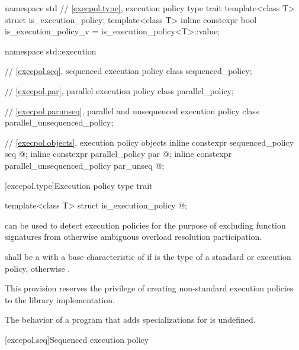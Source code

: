 %
%
\begin{codeblock}
namespace std {
  // \ref{execpol.type}, execution policy type trait
  template<class T> struct is_execution_policy;
  template<class T> inline constexpr bool is_execution_policy_v = is_execution_policy<T>::value;
}

namespace std::execution {
  // \ref{execpol.seq}, sequenced execution policy
  class sequenced_policy;

  // \ref{execpol.par}, parallel execution policy
  class parallel_policy;

  // \ref{execpol.parunseq}, parallel and unsequenced execution policy
  class parallel_unsequenced_policy;

  // \ref{execpol.objects}, execution policy objects
  inline constexpr sequenced_policy            seq{ @\unspec@ };
  inline constexpr parallel_policy             par{ @\unspec@ };
  inline constexpr parallel_unsequenced_policy par_unseq{ @\unspec@ };
}
\end{codeblock}

[execpol.type]{Execution policy type trait}

%
\begin{itemdecl}
template<class T> struct is_execution_policy { @\seebelow@ };
\end{itemdecl}

\begin{itemdescr}
\pnum
{} can be used to detect execution policies for the
purpose of excluding function signatures from otherwise ambiguous overload
resolution participation.

\pnum
{} shall be a  with a
base characteristic of  if  is the type of a standard
or 
execution policy, otherwise .

\begin{note}
This provision reserves the privilege of creating non-standard execution
policies to the library implementation.
\end{note}

\pnum
The behavior of a program that adds specializations for
 is undefined.
\end{itemdescr}

[execpol.seq]{Sequenced execution policy}

